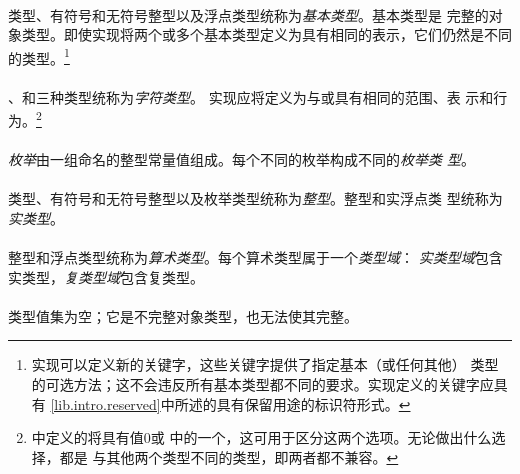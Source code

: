 {\paragraph{}
类型、有符号和无符号整型以及浮点类型统称为\textit{基本类型}。基本类型是
完整的对象类型。即使实现将两个或多个基本类型定义为具有相同的表示，它们仍然是不同
的类型。\footnote{实现可以定义新的关键字，这些关键字提供了指定基本（或任何其他）
类型的可选方法；这不会违反所有基本类型都不同的要求。实现定义的关键字应具有
\ref{lib.intro.reserved}中所述的具有保留用途的标识符形式。}

\paragraph{}
、和三种类型统称为\textit{字符类型}。
实现应将定义为与或具有相同的范围、表
示和行为。\footnote{中定义的将具有值$0$或
中的一个，这可用于区分这两个选项。无论做出什么选择，都是
与其他两个类型不同的类型，即两者都不兼容。}

\paragraph{}
\textit{枚举}由一组命名的整型常量值组成。每个不同的枚举构成不同的\textit{枚举类
型}。

\paragraph{}
类型、有符号和无符号整型以及枚举类型统称为\textit{整型}。整型和实浮点类
型统称为\textit{实类型}。

\paragraph{}
整型和浮点类型统称为\textit{算术类型}。每个算术类型属于一个\textit{类型域}：
\textit{实类型域}包含实类型，\textit{复类型域}包含复类型。

\paragraph{}
类型值集为空；它是不完整对象类型，也无法使其完整。

}
